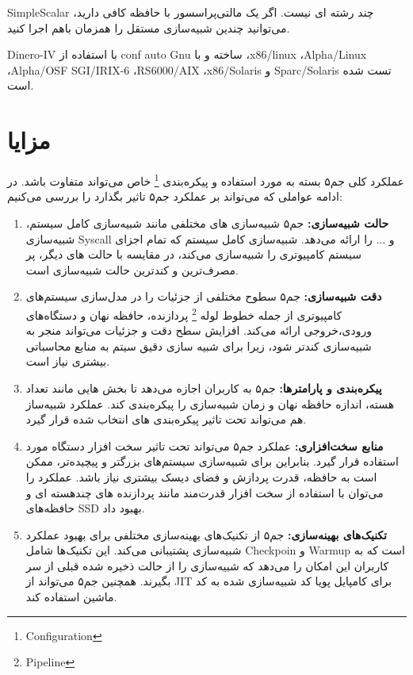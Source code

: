 \documentclass[12pt]{exam}
\begin{document}
\begin{multicols}{2}
	SimpleScalar چند رشته ای نیست. اگر یک مالتی‌پراسسور با حافظه کافی دارید، می‌توانید چندین شبیه‌سازی مستقل را همزمان باهم اجرا کنید.
	
	Dinero-IV با استفاده از conf auto Gnu ساخته و با ،x86/linux ،Alpha/Linux ،Alpha/OSF SGI/IRIX-6 ،RS6000/AIX ،x86/Solaris و Sparc/Solaris تست شده است.
	
	
	
	\section{مزایا}
	عملکرد کلی جم۵ بسته به مورد استفاده و پیکره‌بندی \footnote{Configuration} خاص می‌تواند متفاوت باشد. در ادامه عواملی که می‌تواند بر عملکرد جم۵ تاثیر بگذارد را بررسی می‌کنیم:
	
	\begin{enumerate}[label=\Roman*.]
		\item \textbf{حالت شبیه‌سازی: }جم۵ شبیه‌سازی های مختلفی مانند شبیه‌سازی کامل سیستم، شبیه‌سازی Syscall و ... را ارائه می‌دهد. شبیه‌سازی کامل سیستم که تمام اجزای سیستم کامپیوتری را شبیه‌سازی می‌کند، در مقایسه با حالت های دیگر، پر مصرف‌ترین و کند‌ترین حالت شبیه‌سازی است.
		
		\item \textbf{دقت شبیه‌سازی: }جم۵ سطوح مختلفی از جزئیات را در مدل‌سازی سیستم‌های کامپیوتری از جمله خطوط لوله \footnote{Pipeline} پردازنده، حافظه نهان و دستگاه‌های ورودی،خروجی ارائه می‌کند. افزایش سطح دقت و جزئیات می‌تواند منجر به شبیه‌سازی کند‌تر شود، زیرا برای شبیه سازی دقیق سیتم به منابع محاسباتی بیشتری نیاز است.
		
		\item \textbf{پیکره‌بندی و پارامترها: }جم۵ به کاربران اجازه می‌دهد تا بخش هایی مانند تعداد هسته، اندازه حافظه نهان و زمان شبیه‌سازی را پیکره‌بندی کند. عملکرد شبیه‌ساز هم می‌تواند تحت تاثیر پیکره‌بندی های انتخاب شده قرار گیرد.
		
		\item \textbf{منابع سخت‌افزاری: }عملکرد جم۵ می‌تواند تحت تاثیر سخت افزار دستگاه مورد استفاده قرار گیرد. بنابراین برای شبیه‌سازی سیستم‌های بزرگتر و پیچیده‌تر، ممکن است به حافظه، قدرت پردازش و فضای دیسک بیشتری نیاز باشد. عملکرد را می‌توان با استفاده از سخت افزار قدرت‌مند مانند پردازنده های چند‌هسته ای و حافظه‌های SSD بهبود داد.
		
		\item \textbf{تکنیک‌های بهینه‌سازی:‌ }جم۵ از تکنیک‌های بهینه‌سازی مختلفی برای بهبود عملکرد شبیه‌سازی پشتیبانی می‌کند. این تکنیک‌ها شامل Checkpoin و Warmup است که به کاربران این امکان را می‌دهد که شبیه‌سازی را از حالت ذخیره شده قبلی از سر بگیرند. همچنین جم۵ می‌تواند از JIT برای کامپایل پویا کد شبیه‌سازی شده به کد ماشین استفاده کند.	
	\end{enumerate}
	

\end{multicols}
\end{document}
